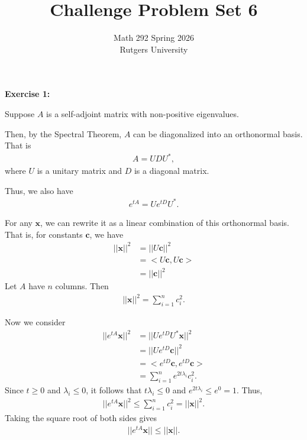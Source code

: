 \documentclass[12pt]{article}
\title{Challenge Problem Set 6}
\author{Math 292 Spring 2026 \\ Rutgers University}
\date{}
\begin{document}
\maketitle

\noindent{}\textbf{Exercise 1:}

Suppose $A$ is a self-adjoint matrix with non-positive eigenvalues.

Then, by the Spectral Theorem, $A$ can be diagonalized into an orthonormal basis. That is
\begin{align*}
    A = UDU^*,
\end{align*}
where $U$ is a unitary matrix and $D$ is a diagonal matrix.


Thus, we also have
\begin{align*}
    e^{tA} = Ue^{tD}U^*.
\end{align*}

For any $\mathbf{x}$, we can rewrite it as a linear combination of this orthonormal basis.
That is, for constants $\mathbf{c}$, we have
\begin{align*}
    ||\mathbf{x}||^2 & = ||U\mathbf{c}||^2          \\
                     & = <U\mathbf{c}, U\mathbf{c}> \\
                     & = ||\mathbf{c}||^2
\end{align*}
Let $A$ have $n$ columns. Then
\begin{align*}
    ||\mathbf{x}||^2 = \sum_{i=1}^{n} c_i^2.
\end{align*}

Now we consider
\begin{align*}
    ||e^{tA}\mathbf{x}||^2 & = ||Ue^{tD}U^*\mathbf{x}||^2           \\
                           & = ||Ue^{tD}\mathbf{c}||^2              \\
                           & = <e^{tD}\mathbf{c}, e^{tD}\mathbf{c}> \\
                           & = \sum_{i=1}^n e^{2t\lambda_i}c_i^2.
\end{align*}
Since $t \geq 0$ and $\lambda_i \leq 0$, it follows that $t\lambda_i \leq 0$ and $e^{2t\lambda_i} \leq e^{0} = 1$.
Thus,
\begin{align*}
    ||e^{tA}\mathbf{x}||^2 \leq \sum_{i=1}^n c_i^2 = ||\mathbf{x}||^2.
\end{align*}
Taking the square root of both sides gives
\begin{align*}
    ||e^{tA}\mathbf{x}|| \leq ||\mathbf{x}||.
\end{align*}
\end{document}
